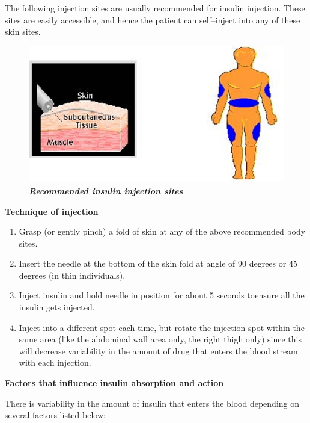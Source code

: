 The following injection sites are usually recommended for insulin injection. These sites are easily accessible, and hence the patient can self–inject into any of these skin sites.

\begin{figure}[h]
\centering
\includegraphics[scale=1.6]{images/089.jpg}\\
\textbf{\textit{Recommended insulin injection sites}}
\end{figure}

\noindent\textbf{Technique of injection}

\begin{enumerate}[•]
\itemsep=0pt
\item Grasp (or gently pinch) a fold of skin at any of the above reco\-mmended body sites.
\item Insert the needle at the bottom of the skin fold at angle of 90 degrees or 45 degrees (in thin individuals).
\item Inject insulin and hold needle in position for about 5 seconds to\break ensure all the insulin gets injected.
\item Inject into a different spot each time, but rotate the injection spot within the same area (like the abdominal wall area only, the right thigh only) since this will decrease variability in the amount of drug that enters the blood stream with each injection.
\end{enumerate}

\noindent\textbf{Factors that influence insulin absorption and action}

There is variability in the amount of insulin that enters the blood depending on several factors listed below:

